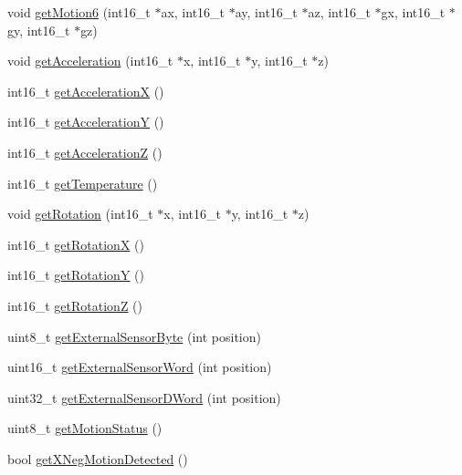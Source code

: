 \begin{DoxyCompactItemize}
\item 
void \mbox{\hyperlink{class_m_p_u6050_a574d3093dc131e4251a9b37adf208ca7}{get\+Motion6}} (int16\+\_\+t $\ast$ax, int16\+\_\+t $\ast$ay, int16\+\_\+t $\ast$az, int16\+\_\+t $\ast$gx, int16\+\_\+t $\ast$gy, int16\+\_\+t $\ast$gz)
\item 
void \mbox{\hyperlink{class_m_p_u6050_a658dfc7e35b7fdba360a75f137bde33a}{get\+Acceleration}} (int16\+\_\+t $\ast$x, int16\+\_\+t $\ast$y, int16\+\_\+t $\ast$z)
\item 
int16\+\_\+t \mbox{\hyperlink{class_m_p_u6050_aa68475158c22128e5459c4c5e19439dc}{get\+AccelerationX}} ()
\item 
int16\+\_\+t \mbox{\hyperlink{class_m_p_u6050_a27240b90d3e03c85b7a619b794bb1756}{get\+AccelerationY}} ()
\item 
int16\+\_\+t \mbox{\hyperlink{class_m_p_u6050_acf5f5a20c10d99a1bdedf139f897bfdf}{get\+AccelerationZ}} ()
\item 
int16\+\_\+t \mbox{\hyperlink{class_m_p_u6050_aedfa4f1e6507f48c0a09545345a87875}{get\+Temperature}} ()
\item 
void \mbox{\hyperlink{class_m_p_u6050_a8ca85b87e7e0230921062fce7889b0d1}{get\+Rotation}} (int16\+\_\+t $\ast$x, int16\+\_\+t $\ast$y, int16\+\_\+t $\ast$z)
\item 
int16\+\_\+t \mbox{\hyperlink{class_m_p_u6050_a268f52843a24992ff06a3f12392de584}{get\+RotationX}} ()
\item 
int16\+\_\+t \mbox{\hyperlink{class_m_p_u6050_a97cbe7f10dd27e07bd78d1c25e4286b5}{get\+RotationY}} ()
\item 
int16\+\_\+t \mbox{\hyperlink{class_m_p_u6050_ae0fee1ba996a2b6f914df6fc34e7da48}{get\+RotationZ}} ()
\item 
uint8\+\_\+t \mbox{\hyperlink{class_m_p_u6050_a7f786ab4264f40e5a95e8937ec9adcc2}{get\+External\+Sensor\+Byte}} (int position)
\item 
uint16\+\_\+t \mbox{\hyperlink{class_m_p_u6050_aaee15e48af7ba78660b5754f3bb5f37a}{get\+External\+Sensor\+Word}} (int position)
\item 
uint32\+\_\+t \mbox{\hyperlink{class_m_p_u6050_afd8983f0911e37015434bebc85185fb2}{get\+External\+Sensor\+D\+Word}} (int position)
\item 
uint8\+\_\+t \mbox{\hyperlink{class_m_p_u6050_af6e4fd231a9db99bd4270cf640eeae46}{get\+Motion\+Status}} ()
\item 
bool \mbox{\hyperlink{class_m_p_u6050_a446d235905783c5b90637a6b6792ac76}{get\+X\+Neg\+Motion\+Detected}} ()
\item 

\end{DoxyCompactItemize}
